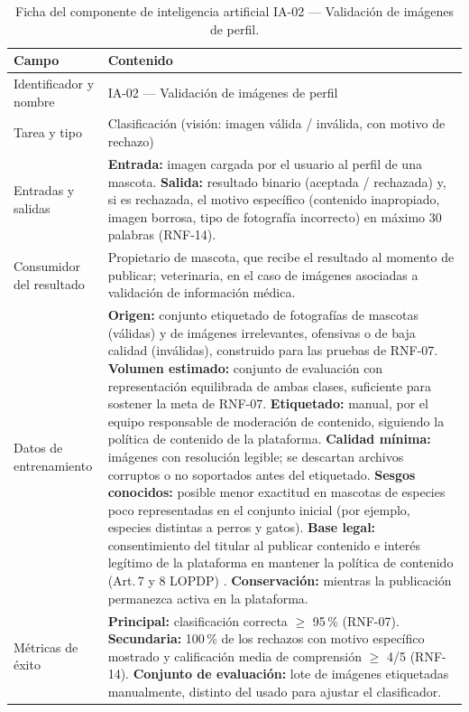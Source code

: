 \documentclass[journal,onecolumn]{IEEEtran}
\begin{document}
\begin{table}[H]
	\caption{Ficha del componente de inteligencia artificial IA-02 --- Validación de imágenes de perfil.}
	\label{tab:ficha_ia02}
	\small
	\begin{tabularx}{\textwidth}{|L{4.2cm}|X|}
		\hline
		\textbf{Campo} & \textbf{Contenido} \\
		\hline
		Identificador y nombre & IA-02 --- Validación de imágenes de perfil \\
		\hline
		Tarea y tipo & Clasificación (visión: imagen válida / inválida, con motivo de rechazo) \\
		\hline
		Entradas y salidas & \textbf{Entrada:} imagen cargada por el usuario al perfil de una mascota. \textbf{Salida:} resultado binario (aceptada / rechazada) y, si es rechazada, el motivo específico (contenido inapropiado, imagen borrosa, tipo de fotografía incorrecto) en máximo 30 palabras (RNF-14). \\
		\hline
		Consumidor del resultado & Propietario de mascota, que recibe el resultado al momento de publicar; veterinaria, en el caso de imágenes asociadas a validación de información médica. \\
		\hline
		Datos de entrenamiento & \textbf{Origen:} conjunto etiquetado de fotografías de mascotas (válidas) y de imágenes irrelevantes, ofensivas o de baja calidad (inválidas), construido para las pruebas de RNF-07. \textbf{Volumen estimado:} conjunto de evaluación con representación equilibrada de ambas clases, suficiente para sostener la meta de RNF-07. \textbf{Etiquetado:} manual, por el equipo responsable de moderación de contenido, siguiendo la política de contenido de la plataforma. \textbf{Calidad mínima:} imágenes con resolución legible; se descartan archivos corruptos o no soportados antes del etiquetado. \textbf{Sesgos conocidos:} posible menor exactitud en mascotas de especies poco representadas en el conjunto inicial (por ejemplo, especies distintas a perros y gatos). \textbf{Base legal:} consentimiento del titular al publicar contenido e interés legítimo de la plataforma en mantener la política de contenido (Art.\,7 y 8 LOPDP) \cite{lopdp2021}. \textbf{Conservación:} mientras la publicación permanezca activa en la plataforma. \\
		\hline
		Métricas de éxito & \textbf{Principal:} clasificación correcta $\geq$ 95\,\% (RNF-07). \textbf{Secundaria:} 100\,\% de los rechazos con motivo específico mostrado y calificación media de comprensión $\geq$ 4/5 (RNF-14). \textbf{Conjunto de evaluación:} lote de imágenes etiquetadas manualmente, distinto del usado para ajustar el clasificador. \\

\end{tabularx}
\end{table}
\end{document}
